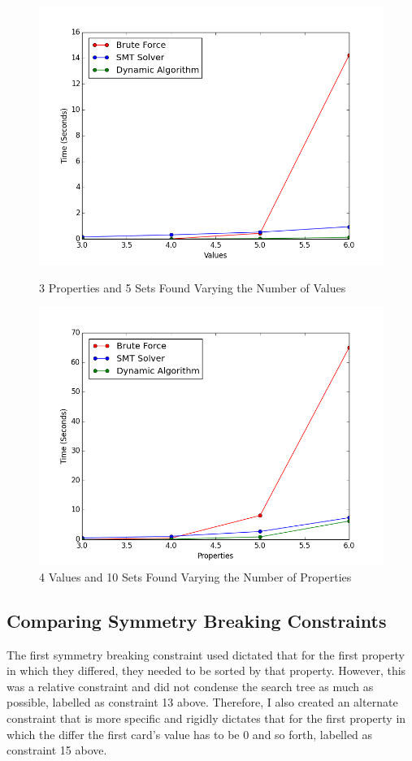 \documentclass[pageno]{jpaper}
\begin{document}
\begin{figure}[htbb]
\begin{minipage}[b]{0.5\linewidth}
\centering
\includegraphics[width=.75\linewidth]{BADBRUTEVAL-v3456p3n5.png}
\caption{3 Properties and 5 Sets Found Varying the Number of Values}
\label{fig:bruteVal}
\end{minipage}
\hspace{0.5cm}
\begin{minipage}[b]{0.5\linewidth}
\centering
\includegraphics[width=.75\linewidth]{BADBRUTEPROP-v4p3456n10.png}
\caption{4 Values and 10 Sets Found Varying the Number of Properties}
\label{fig:bruteProp}
\end{minipage}
\end{figure}



\subsection{Comparing Symmetry Breaking Constraints}

The first symmetry breaking constraint used dictated that for the first property in which they differed, they needed to be sorted by that property. However, this was a relative constraint and did not condense the search tree as much as possible, labelled as constraint 13 above. Therefore, I also created an alternate constraint that is more specific and rigidly dictates that for the first property in which the differ the first card's value has to be 0 and so forth, labelled as constraint 15 above. 
\end{document}
